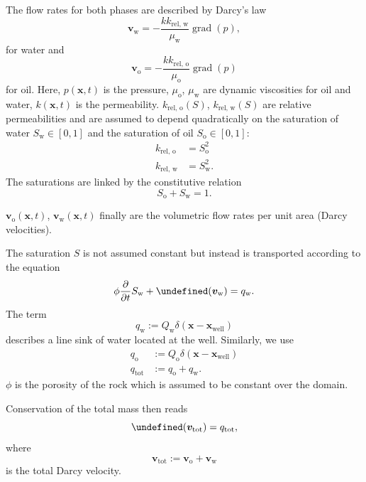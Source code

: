 \documentclass[conference]{IEEEtran}
\DeclareMathOperator*{\grad}{grad}
\let\div\undefined
\DeclareMathOperator*{\div}{div}
\newcommand*{\pdiff}[2]{\ensuremath{\frac{\partial}{\partial{#2}}{#1}}}
\renewcommand*{\vec}[1]{\ensuremath{{\bm{#1}}}}
\begin{document}
The flow rates for both phases are described by Darcy's law
\begin{equation}
\label{flowrateWater}
\vec{v}_\text{w} = -\frac{k k_\text{rel, w}}{\mu_\text{w}} \grad(p),
\end{equation}
for water and
\begin{equation}
\label{flowrateOil}
\vec{v}_\text{o} = -\frac{k k_\text{rel, o}}{\mu_\text{o}} \grad(p)
\end{equation}
for oil.
Here, $p(\vec{x}, t)$ is the pressure, $\mu_\text{o}$, $\mu_\text{w}$ are dynamic viscosities for oil and water, $k(\vec{x}, t)$ is the permeability.
$k_\text{rel, o}(S)$, $k_\text{rel, w}(S)$ are relative permeabilities and are assumed to depend quadratically on the saturation of water $S_\text{w} \in [0, 1]$ and the saturation of oil $S_\text{o} \in [0, 1]$:
\begin{align}
\label{relativePermeabilityModel}
k_\text{rel, o} &= S_\text{o}^2\\
k_\text{rel, w} &= S_\text{w}^2.
\end{align}
The saturations are linked by the constitutive relation
\begin{equation}
S_\text{o} + S_\text{w} = 1.
\end{equation}

$\vec{v}_\text{o}(\vec{x}, t)$, $\vec{v}_\text{w}(\vec{x}, t)$ finally are the volumetric flow rates per unit area (Darcy velocities).

The saturation $S$ is not assumed constant but instead is transported according to the equation
\begin{equation}
\label{stransp}
\phi\pdiff{S_\text{w}}{t} + \div(\vec{v}_\text{w}) = q_\text{w}.
\end{equation}
The term
\begin{equation}
q_\text{w} := Q_\text{w}\delta(\vec{x} - \vec{x}_\text{well})
\end{equation}
describes a line sink of water located at the well.
Similarly, we use
\begin{align}
q_\text{o} &:= Q_\text{o}\delta(\vec{x} - \vec{x}_\text{well}) \\
q_\text{tot} &:= q_\text{o} + q_\text{w}.
\end{align}
$\phi$ is the porosity of the rock which is assumed to be constant over the domain.

Conservation of the total mass then reads
\begin{equation}
\label{conservationOfMass}
\div(\vec{v}_\text{tot}) = q_\text{tot},
\end{equation}
where
\begin{equation}
\vec{v}_\text{tot} := \vec{v}_\text{o} + \vec{v}_\text{w}
\end{equation}
is the total Darcy velocity.
\end{document}
